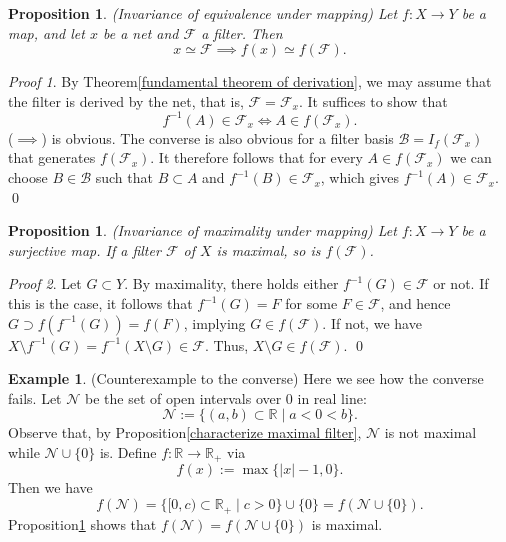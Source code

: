 \documentclass[a4paper,12pt]{article}
\newtheorem{prp}[thm]{Proposition}
\theoremstyle{remark}
\newtheorem*{prf}{Proof}
\theoremstyle{definition}
\theoremstyle{definition}
\newtheorem{ex}[thm]{Example}
\theoremstyle{definition}
\begin{document}
\begin{prp}\label{invariance under mapping} (Invariance of equivalence under mapping)
	Let \( f:X \to Y \) be a map, and let \( x \) be a net and \( \mathscr{F} \) a filter. Then
	\[
		x \simeq \mathscr{F} \implies f(x)\simeq f(\mathscr{F}).
	\]
\end{prp}
\begin{prf}
	By Theorem\ref{fundamental theorem of derivation}, we may assume that the filter is derived by the net, that is, \( \mathscr{F} = \mathscr{F}_x \).
	It suffices to show that
	\begin{equation*}
		f^{-1}(A)\in \mathscr{F}_x \iff A \in f(\mathscr{F}_x).
	\end{equation*}
	(\( \implies \)) is obvious. The converse is also obvious for a filter basis \( \mathscr{B}=I_f(\mathscr{F}_x) \) that generates \( f(\mathscr{F}_x) \). It therefore follows that for every \( A \in f(\mathscr{F}_x)\) we can choose \( B \in \mathscr{B} \) such that \( B \subset A \) and \( f^{-1}(B) \in \mathscr{F}_x \), which gives \( f^{-1}(A) \in \mathscr{F}_x \).
	\qed\end{prf}

\begin{prp}\label{invariace of maximality under mapping} (Invariance of maximality under mapping)
	Let \( f:X \to Y \) be a surjective map. If a filter \( \mathscr{F} \) of \( X \) is maximal, so is \( f(\mathscr{F}) \).
\end{prp}
\begin{prf}
	Let \( G \subset Y \). By maximality, there holds either \( f^{-1}(G)\in \mathscr{F} \) or not. If this is the case, it follows that \( f^{-1}(G) = F \) for some \( F \in \mathscr{F} \), and hence \( G \supset f(f^{-1}(G))=f(F) \), implying \( G \in f(\mathscr{F}) \). If not, we have \( X \setminus f^{-1}(G) = f^{-1}(X \setminus G) \in \mathscr{F} \). Thus, \( X \setminus G \in f(\mathscr{F}) \).
	\qed\end{prf}

\begin{ex} (Counterexample to the converse)
	Here we see how the converse fails. Let \( \mathscr{N} \) be the set of open intervals over 0 in real line:
	\[
		\mathscr{N} := \{(a,b) \subset \mathbb{R} \mid a<0<b\}.
	\]
	Observe that, by Proposition\ref{characterize maximal filter}, \( \mathscr{N} \) is not maximal while \( \mathscr{N}\cup \{0\} \) is.
	Define \( f:\mathbb{R}\to \mathbb{R}_+ \) via
	\[
		f(x):=\max \{|x|-1,0\}.
	\]
	Then we have
	\[
		f(\mathscr{N}) =\{[0,c) \subset \mathbb{R}_+ \mid c>0\} \cup \{0\} = f(\mathscr{N}\cup \{0\}).
	\]
	Proposition\ref{invariace of maximality under mapping} shows that \( f(\mathscr{N}) = f(\mathscr{N}\cup \{0\}) \) is maximal.
\end{ex}
\end{document}
